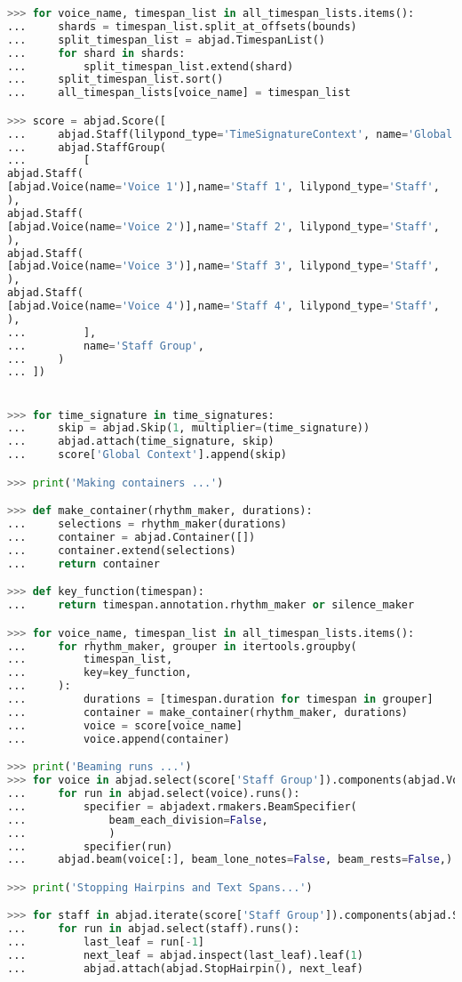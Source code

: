 \begin{lstlisting}[language=Python, caption=Demonstration of AttachmentHandlers]
>>> for voice_name, timespan_list in all_timespan_lists.items():
...     shards = timespan_list.split_at_offsets(bounds)
...     split_timespan_list = abjad.TimespanList()
...     for shard in shards:
...         split_timespan_list.extend(shard)
...     split_timespan_list.sort()
...     all_timespan_lists[voice_name] = timespan_list

>>> score = abjad.Score([
...     abjad.Staff(lilypond_type='TimeSignatureContext', name='Global Context'),
...     abjad.StaffGroup(
...         [
abjad.Staff(
[abjad.Voice(name='Voice 1')],name='Staff 1', lilypond_type='Staff',
),
abjad.Staff(
[abjad.Voice(name='Voice 2')],name='Staff 2', lilypond_type='Staff',
),
abjad.Staff(
[abjad.Voice(name='Voice 3')],name='Staff 3', lilypond_type='Staff',
),
abjad.Staff(
[abjad.Voice(name='Voice 4')],name='Staff 4', lilypond_type='Staff',
),
...         ],
...         name='Staff Group',
...     )
... ])


>>> for time_signature in time_signatures:
...     skip = abjad.Skip(1, multiplier=(time_signature))
...     abjad.attach(time_signature, skip)
...     score['Global Context'].append(skip)

>>> print('Making containers ...')

>>> def make_container(rhythm_maker, durations):
...     selections = rhythm_maker(durations)
...     container = abjad.Container([])
...     container.extend(selections)
...     return container

>>> def key_function(timespan):
... 	return timespan.annotation.rhythm_maker or silence_maker

>>> for voice_name, timespan_list in all_timespan_lists.items():
...     for rhythm_maker, grouper in itertools.groupby(
...         timespan_list,
...         key=key_function,
...     ):
...         durations = [timespan.duration for timespan in grouper]
...         container = make_container(rhythm_maker, durations)
...         voice = score[voice_name]
...         voice.append(container)

>>> print('Beaming runs ...')
>>> for voice in abjad.select(score['Staff Group']).components(abjad.Voice):
...     for run in abjad.select(voice).runs():
...         specifier = abjadext.rmakers.BeamSpecifier(
...             beam_each_division=False,
...             )
...         specifier(run)
...     abjad.beam(voice[:], beam_lone_notes=False, beam_rests=False,)

>>> print('Stopping Hairpins and Text Spans...')

>>> for staff in abjad.iterate(score['Staff Group']).components(abjad.Staff):
...     for run in abjad.select(staff).runs():
...         last_leaf = run[-1]
...         next_leaf = abjad.inspect(last_leaf).leaf(1)
...         abjad.attach(abjad.StopHairpin(), next_leaf)


\end{lstlisting}
